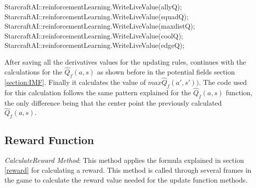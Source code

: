 \begin{Sourcecode}[caption=Saving the values of each derivative]
		StarcraftAI::reinforcementLearning.WriteLiveValue(allyQ);
		StarcraftAI::reinforcementLearning.WriteLiveValue(squadQ); 
		StarcraftAI::reinforcementLearning.WriteLiveValue(maxdistQ);
		StarcraftAI::reinforcementLearning.WriteLiveValue(coolQ);
		StarcraftAI::reinforcementLearning.WriteLiveValue(edgeQ);
\end{Sourcecode}

After saving all the derivatives values for the updating rules, continues with the calculations for the $\hat{Q}_f(a,s)$ as shown before in the potential fields section \ref{section:IMF}. Finally it calculates the value of $max\hat{Q}_f(a',s'))$. The code used for this calculation follows the same pattern explained for the $\hat{Q}_f(a,s)$ function, the only difference being that the center point the previously calculated $\hat{Q}_f(a,s)$.

\subsection{Reward Function}
 
\textit{CalculateReward Method}: This method applies the formula explained in section \ref{reward} for calculating a reward. This method is called through several frames in the game to calculate the reward value needed for the update function methods.\\

